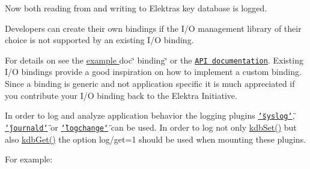Now both reading from and writing to Elektra\textquotesingle{}s key database is logged.

Developers can create their own bindings if the I/O management library of their choice is not supported by an existing I/O binding.

For details on see the \hyperlink{md_src_bindings_io_doc_README_src_bindings_io_doc_README_md}{example }doc\char`\"{} binding\char`\"{} or the \href{https://doc.libelektra.org/api/current/html/group__kdbio.html}{\tt A\+PI documentation}. Existing I/O bindings provide a good inspiration on how to implement a custom binding. Since a binding is generic and not application specific it is much appreciated if you contribute your I/O binding back to the Elektra Initiative.

In order to log and analyze application behavior the logging plugins \href{https://www.libelektra.org/plugins/syslog}{\tt \char`\"{}syslog\char`\"{}}, \href{https://www.libelektra.org/plugins/journald}{\tt \char`\"{}journald\char`\"{}} or \href{https://www.libelektra.org/plugins/logchange}{\tt \char`\"{}logchange\char`\"{}} can be used. In order to log not only {\ttfamily \hyperlink{group__kdb_ga11436b058408f83d303ca5e996832bcf}{kdb\+Set()}} but also {\ttfamily \hyperlink{group__kdb_ga28e385fd9cb7ccfe0b2f1ed2f62453a1}{kdb\+Get()}} the option {\ttfamily log/get=1} should be used when mounting these plugins.

For example\+:


 